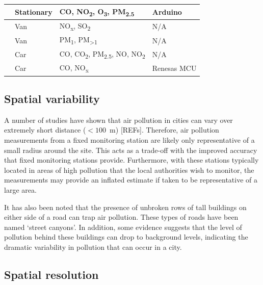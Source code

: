 \documentclass[11pt,twosided,a4paper]{report}
\begin{document}
\begin{landscape}
\begin{longtable}{ p{} p{} p{} p{} }
  \cite{sun2016HKmarathonML} & Stationary & CO, NO\textsubscript{2}, O\textsubscript{3}, PM\textsubscript{2.5} & Arduino \\ \midrule
  \cite{Wallace2009mobilehamilton} & Van & NO\textsubscript{x}, SO\textsubscript{2} & N/A \\ \midrule
  \cite{Weijers2004movingmeasurementunit} & Van & PM\textsubscript{1}, PM\textsubscript{\textgreater 1} & N/A \\ \midrule
  \cite{Westerdahl2005losangeles} & Car & CO, CO\textsubscript{2}, PM\textsubscript{2.5}, NO, NO\textsubscript{2} & N/A \\ \midrule
  \cite{Wong2009envmonitoringtemporal} & Car & CO, NO\textsubscript{x} & Renesas MCU \\ \bottomrule
  \hline
\end{longtable}

\end{landscape}

\restoregeometry


\subsection{Spatial variability}

A number of studies have shown that air pollution in cities can vary over extremely short distance ($ < 100$~m) [REFs]. Therefore, air pollution measurements from a fixed monitoring station are likely only representative of a small radius around the site. This acts as a trade-off with the improved accuracy that fixed monitoring stations provide. Furthermore, with these stations typically located in areas of high pollution that the local authorities wish to monitor, the measurements may provide an inflated estimate if taken to be representative of a large area.

It has also been noted that the presence of unbroken rows of tall buildings on either side of a road can trap air pollution. These types of roads have been named `street canyons'. In addition, some evidence suggests that the level of pollution behind these buildings can drop to background levels, indicating the dramatic variability in pollution that can occur in a city.

\subsection{Spatial resolution} \label{spatialres}
\end{document}
